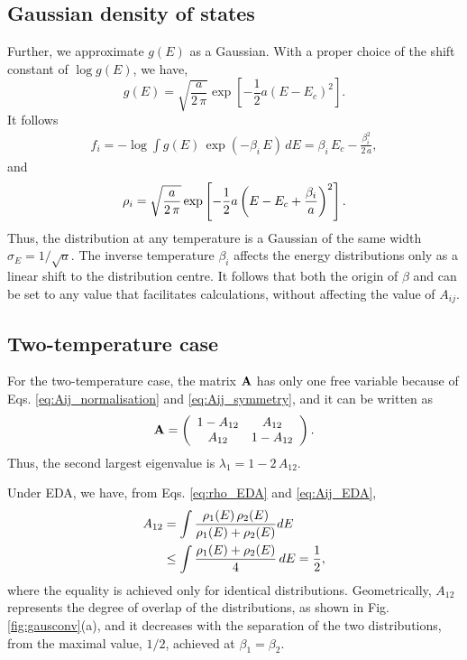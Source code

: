 \documentclass{gMOS2e}
\begin{document}
\subsection{Gaussian density of states}



Further, we approximate $g(E)$
as a Gaussian.
%
With a proper choice of the shift constant of
$\log g(E)$, we have,
%
\begin{equation}
g(E)
=
\sqrt{
  \frac{ a } { 2 \, \pi }
}
\exp\left[ -\frac 1 2 a (E - E_c)^2 \right].
\label{eq:gE_Gaussian}
\end{equation}
%
It follows
%
\begin{align}
f_i
=
-\log
\int
g(E) \, \exp(-\beta_i \, E) \, dE
=
\beta_i \, E_c - \frac{ \beta_i^2 }{ 2 \, a },
\label{eq:f_Gaussian}
\end{align}
%
and
\begin{align}
\rho_i
=
\sqrt{ \frac a { 2 \, \pi} }
\exp\left[
  -\frac 1 2
  a \left(
    E - E_c + \frac { \beta_i } { a }
  \right)^2
\right].
\notag
\end{align}
%
Thus,
the distribution at any temperature
is a Gaussian of the same width
$\sigma_E = 1/\sqrt{a}$.
%
The inverse temperature $\beta_i$
affects the energy distributions
only as a linear shift
to the distribution centre.
%
It follows that both the origin of $\beta$
and 
can be set to any value
that facilitates calculations,
without affecting the value of $A_{ij}$.



\subsection{Two-temperature case}



For the two-temperature case,
the matrix $\mathbf{A}$ has only one free variable
because of Eqs. \eqref{eq:Aij_normalisation}
and \eqref{eq:Aij_symmetry},
and it can be written as
%
\begin{align*}
\mathbf{A}
=
\left(
\begin{array}{ccc}
  1 - A_{12} & A_{12} \\
  A_{12}     & 1 - A_{12}
\end{array}
\right).
\end{align*}
%
Thus,
the second largest eigenvalue is
$\lambda_1 = 1 - 2 \, A_{12}$.



Under EDA,
we have, from
Eqs. \eqref{eq:rho_EDA} and \eqref{eq:Aij_EDA},
%
\begin{align}
A_{12}
&=
\int
\frac{ \rho_1(E) \, \rho_2(E) }
{ \rho_1(E) + \rho_2(E) }
dE
\notag \\
&\le
\int
\frac{ \rho_1(E) + \rho_2(E) }
{ 4 }
\, dE
= \frac 1 2,
\notag
\end{align}
where
the equality is achieved
only for identical distributions.
%
Geometrically,
$A_{12}$
represents the degree of overlap
of the distributions,
as shown in Fig. \ref{fig:gausconv}(a),
%
and it decreases
with the separation
of the two distributions,
from the maximal value, $1/2$,
achieved at $\beta_1 = \beta_2$.
\end{document}
